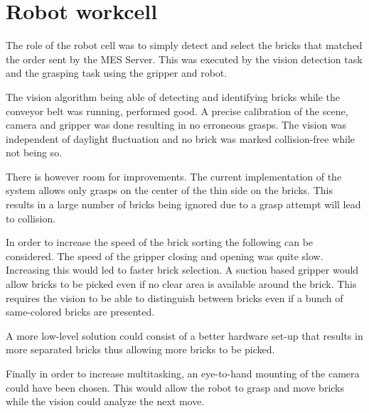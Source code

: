 	\section{Robot workcell} %
	\label{sub:robot_workcell}
	
	The role of the robot cell was to simply detect and select the bricks that matched the order sent by the MES Server. This was executed by the vision detection task and the grasping task using the gripper and robot. 

	The vision algorithm being able of detecting and identifying bricks while the conveyor belt was running, performed good. A precise calibration of the scene, camera and gripper was done resulting in no erroneous grasps. The vision was independent of daylight fluctuation and no brick was marked collision-free while not being so.

	There is however room for improvements. The current implementation of the system allows only grasps on the center of the thin side on the bricks. This results in a large number of bricks being ignored due to a grasp attempt will lead to collision. 

	In order to increase the speed of the brick sorting the following can be considered. 
	The speed of the gripper closing and opening was quite slow. Increasing this would led to faster brick selection. 
	A suction based gripper would allow bricks to be picked even if no clear area is available around the brick. This requires the vision to be able to distinguish between bricks even if a bunch of same-colored bricks are presented. 

	A more low-level solution could consist of a better hardware set-up that results in more separated bricks thus allowing more bricks to be picked. 

	Finally in order to increase multitasking, an eye-to-hand mounting of the camera could have been chosen. This would allow the robot to grasp and move bricks while the vision could analyze the next move. 

